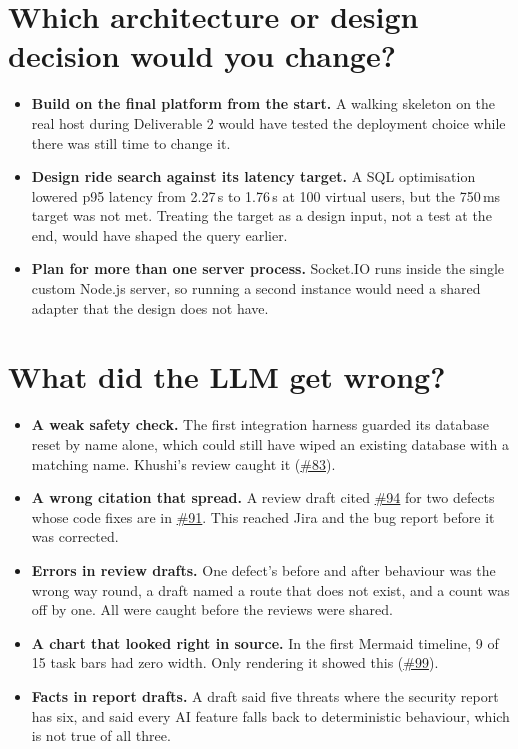 \documentclass[10pt]{article}
\newcommand{\repourl}{https://github.com/CS455-Carpooling/Campus_Ridepooling_Automation}
\newcommand{\pr}[1]{\href{\repourl/pull/#1}{\##1}}
\begin{document}
\section{Which architecture or design decision would you change?}
\begin{itemize}
  \item \textbf{Build on the final platform from the start.} A walking skeleton on the real host during
    Deliverable 2 would have tested the deployment choice while there was still time to change it.
  \item \textbf{Design ride search against its latency target.} A SQL optimisation lowered p95 latency from
    2.27\,s to 1.76\,s at 100 virtual users, but the 750\,ms target was not met. Treating the target as a design
    input, not a test at the end, would have shaped the query earlier.
  \item \textbf{Plan for more than one server process.} Socket.IO runs inside the single custom Node.js server,
    so running a second instance would need a shared adapter that the design does not have.
\end{itemize}

\section{What did the LLM get wrong?}
\begin{itemize}
  \item \textbf{A weak safety check.} The first integration harness guarded its database reset by name alone,
    which could still have wiped an existing database with a matching name. Khushi's review caught it (\pr{83}).
  \item \textbf{A wrong citation that spread.} A review draft cited \pr{94} for two defects whose code fixes are in
    \pr{91}. This reached Jira and the bug report before it was corrected.
  \item \textbf{Errors in review drafts.} One defect's before and after behaviour was the wrong way round, a draft
    named a route that does not exist, and a count was off by one. All were caught before the reviews were shared.
  \item \textbf{A chart that looked right in source.} In the first Mermaid timeline, 9 of 15 task bars had zero
    width. Only rendering it showed this (\pr{99}).
  \item \textbf{Facts in report drafts.} A draft said five threats where the security report has six, and said
    every AI feature falls back to deterministic behaviour, which is not true of all three.
\end{itemize}
\end{document}
